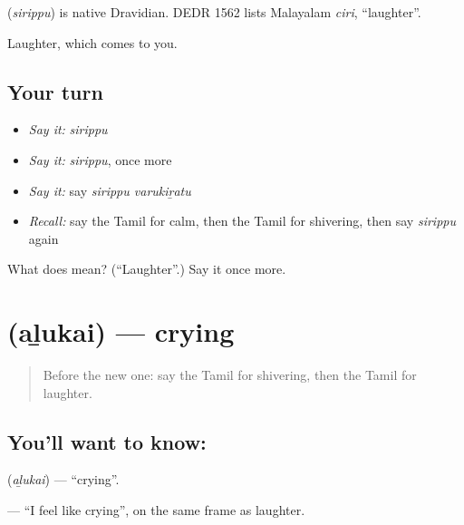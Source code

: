 \begin{cousinweb}
\textbf{} (\emph{sirippu}) is native Dravidian. DEDR 1562 lists Malayalam \emph{ciri}, \textquotedblleft{}laughter\textquotedblright{}.
\end{cousinweb}

\begin{grammarlens}[title={What you've built}]
Laughter, which comes to you.
\end{grammarlens}

\subsection*{Your turn}
\begin{itemize}
\raggedright
  \item \emph{Say it:} \emph{sirippu}
  \item \emph{Say it:} \emph{sirippu}, once more
  \item \emph{Say it:} say \emph{sirippu varukiṟatu}
  \item \emph{Recall:} say the Tamil for calm, then the Tamil for shivering, then say \emph{sirippu} again
\end{itemize}

\begin{tcolorbox}[breakable,colback=teal!4,colframe=teal!35!black,title={Before you move on}]
What does  mean? (\textquotedblleft{}Laughter\textquotedblright{}.) Say it once more.
\end{tcolorbox}
\section[\texorpdfstring{\ta{அழுகை} (aḻukai)}{அழுகை (aḻukai)}]{ (aḻukai) — crying}

\label{lesson:TA-C90-crying}



\begin{quote}
Before the new one: say the Tamil for shivering, then the Tamil for laughter.
\end{quote}

\subsection*{You'll want to know: }
\textbf{} (\emph{aḻukai}) — \textquotedblleft{}crying\textquotedblright{}.

\textbf{ } — \textquotedblleft{}I feel like crying\textquotedblright{}, on the same frame as laughter.

